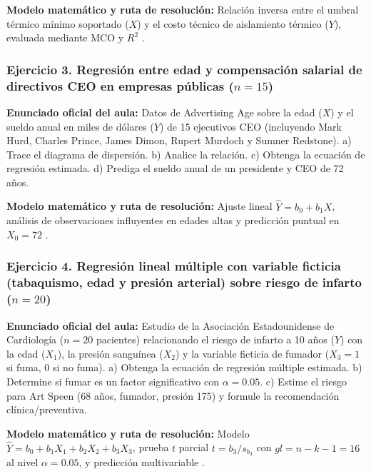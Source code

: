 {\textbf{Modelo matemático y ruta de resolución:} Relación inversa entre el umbral térmico mínimo soportado ($X$) y el costo técnico de aislamiento térmico ($Y$), evaluada mediante MCO y $R^2$ \citep{anderson2012}.

\subsubsection*{Ejercicio 3. Regresión entre edad y compensación salarial de directivos CEO en empresas públicas ($n=15$)}
\textbf{Enunciado oficial del aula:} Datos de Advertising Age sobre la edad ($X$) y el sueldo anual en miles de dólares ($Y$) de 15 ejecutivos CEO (incluyendo Mark Hurd, Charles Prince, James Dimon, Rupert Murdoch y Sumner Redstone). a) Trace el diagrama de dispersión. b) Analice la relación. c) Obtenga la ecuación de regresión estimada. d) Prediga el sueldo anual de un presidente y CEO de 72 años.

\textbf{Modelo matemático y ruta de resolución:} Ajuste lineal $\hat{Y} = b_0 + b_1 X$, análisis de observaciones influyentes en edades altas y predicción puntual en $X_0 = 72$ \citep{anderson2012}.

\subsubsection*{Ejercicio 4. Regresión lineal múltiple con variable ficticia (tabaquismo, edad y presión arterial) sobre riesgo de infarto ($n=20$)}
\textbf{Enunciado oficial del aula:} Estudio de la Asociación Estadounidense de Cardiología ($n = 20$ pacientes) relacionando el riesgo de infarto a 10 años ($Y$) con la edad ($X_1$), la presión sanguínea ($X_2$) y la variable ficticia de fumador ($X_3 = 1$ si fuma, $0$ si no fuma). a) Obtenga la ecuación de regresión múltiple estimada. b) Determine si fumar es un factor significativo con $\alpha = 0.05$. c) Estime el riesgo para Art Speen (68 años, fumador, presión 175) y formule la recomendación clínica/preventiva.

\textbf{Modelo matemático y ruta de resolución:} Modelo $\hat{Y} = b_0 + b_1 X_1 + b_2 X_2 + b_3 X_3$, prueba $t$ parcial $t = b_3 / s_{b_3}$ con $gl = n - k - 1 = 16$ al nivel $\alpha = 0.05$, y predicción multivariable \citep{anderson2012,wackerly2010}.


}
